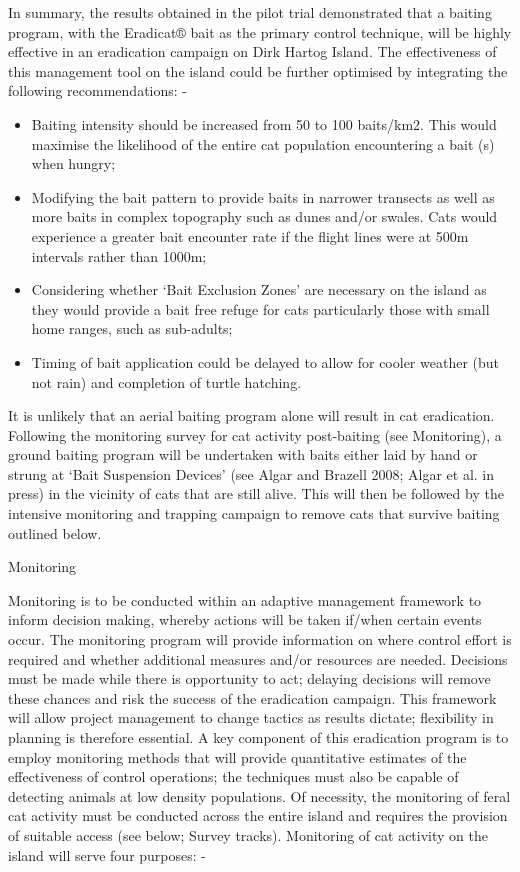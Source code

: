 \documentclass[version=last,
    paper=a4,                               %
    10pt,                                   %
    dvipsnames,
    oneside,                              %
    headings=openany,                       %
    open=any,
    BCOR=7mm,                               %
    DIV=15,     %
]{scrbook}
\begin{document}
In summary, the results obtained in the pilot trial demonstrated that a
baiting program, with the Eradicat® bait as the primary control
technique, will be highly effective in an eradication campaign on Dirk
Hartog Island. The effectiveness of this management tool on the island
could be further optimised by integrating the following recommendations:
-

\begin{itemize}
\itemsep1pt\parskip0pt
\item
  Baiting intensity should be increased from 50 to 100 baits/km2. This
  would maximise the likelihood of the entire cat population
  encountering a bait (s) when hungry;
\item
  Modifying the bait pattern to provide baits in narrower transects as
  well as more baits in complex topography such as dunes and/or swales.
  Cats would experience a greater bait encounter rate if the flight
  lines were at 500m intervals rather than 1000m;
\item
  Considering whether `Bait Exclusion Zones' are necessary on the island
  as they would provide a bait free refuge for cats particularly those
  with small home ranges, such as sub-adults;
\item
  Timing of bait application could be delayed to allow for cooler
  weather (but not rain) and completion of turtle hatching.
\end{itemize}

It is unlikely that an aerial baiting program alone will result in cat
eradication. Following the monitoring survey for cat activity
post-baiting (see Monitoring), a ground baiting program will be
undertaken with baits either laid by hand or strung at `Bait Suspension
Devices' (see Algar and Brazell 2008; Algar et al. in press) in the
vicinity of cats that are still alive. This will then be followed by the
intensive monitoring and trapping campaign to remove cats that survive
baiting outlined below.

Monitoring

Monitoring is to be conducted within an adaptive management framework to
inform decision making, whereby actions will be taken if/when certain
events occur. The monitoring program will provide information on where
control effort is required and whether additional measures and/or
resources are needed. Decisions must be made while there is opportunity
to act; delaying decisions will remove these chances and risk the
success of the eradication campaign. This framework will allow project
management to change tactics as results dictate; flexibility in planning
is therefore essential. A key component of this eradication program is
to employ monitoring methods that will provide quantitative estimates of
the effectiveness of control operations; the techniques must also be
capable of detecting animals at low density populations. Of necessity,
the monitoring of feral cat activity must be conducted across the entire
island and requires the provision of suitable access (see below; Survey
tracks). Monitoring of cat activity on the island will serve four
purposes: -
\end{document}
